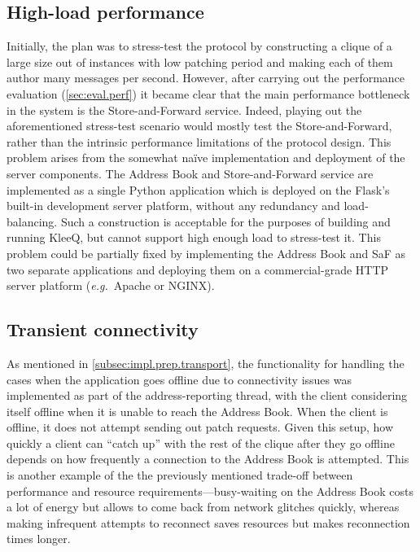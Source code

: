 \documentclass[a4paper, twoside, 12pt]{report}
\begin{document}
\subsection{High-load performance}
Initially, the plan was to stress-test the protocol by constructing a clique of a large size out of instances with low patching period and making each of them author many messages per second. However, after carrying out the performance evaluation (\cref{sec:eval.perf}) it became clear that the main performance bottleneck in the system is the Store-and-Forward service. Indeed, playing out the aforementioned stress-test scenario would mostly test the Store-and-Forward, rather than the intrinsic performance limitations of the protocol design. This problem arises from the somewhat na{\"i}ve implementation and deployment of the server components. The Address Book and Store-and-Forward service are implemented as a single Python application which is deployed on the Flask's built-in development server platform, without any redundancy and load-balancing. Such a construction is acceptable for the purposes of building and running KleeQ, but cannot support high enough load to stress-test it. This problem could be partially fixed by implementing the Address Book and SaF as two separate applications and deploying them on a commercial-grade HTTP server platform (\textit{e.g.}~Apache or NGINX). \\



\subsection{Transient connectivity}
As mentioned in \cref{subsec:impl.prep.transport}, the functionality for handling the cases when the application goes offline due to connectivity issues was implemented as part of the address-reporting thread, with the client considering itself offline when it is unable to reach the Address Book. When the client is offline, it does not attempt sending out patch requests. Given this setup, how quickly a client can ``catch up'' with the rest of the clique after they go offline depends on how frequently a connection to the Address Book is attempted. This is another example of the the previously mentioned trade-off between performance and resource requirements---busy-waiting on the Address Book costs a lot of energy but allows to come back from network glitches quickly, whereas making infrequent attempts to reconnect saves resources but makes reconnection times longer. \\
\end{document}
